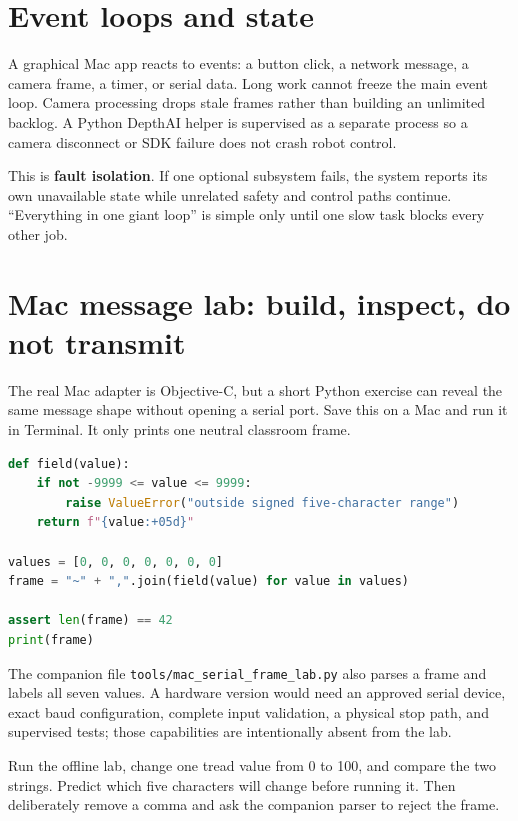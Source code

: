 \documentclass[11pt,openany]{book}
\begin{document}
\section*{Event loops and state}

A graphical Mac app reacts to events: a button click, a network message, a camera frame, a timer, or serial data. Long work cannot freeze the main event loop. Camera processing drops stale frames rather than building an unlimited backlog. A Python DepthAI helper is supervised as a separate process so a camera disconnect or SDK failure does not crash robot control.

\begin{conceptbox}
This is \textbf{fault isolation}. If one optional subsystem fails, the system reports its own unavailable state while unrelated safety and control paths continue. ``Everything in one giant loop'' is simple only until one slow task blocks every other job.
\end{conceptbox}

\section*{Mac message lab: build, inspect, do not transmit}

The real Mac adapter is Objective-C, but a short Python exercise can reveal the same message shape without opening a serial port. Save this on a Mac and run it in Terminal. It only prints one neutral classroom frame.

\begin{lstlisting}[language=Python,caption={A print-only Mac exercise; it does not connect to ROB.}]
def field(value):
    if not -9999 <= value <= 9999:
        raise ValueError("outside signed five-character range")
    return f"{value:+05d}"

values = [0, 0, 0, 0, 0, 0, 0]
frame = "~" + ",".join(field(value) for value in values)

assert len(frame) == 42
print(frame)
\end{lstlisting}

The companion file \texttt{tools/mac\_serial\_frame\_lab.py} also parses a frame and labels all seven values. A hardware version would need an approved serial device, exact baud configuration, complete input validation, a physical stop path, and supervised tests; those capabilities are intentionally absent from the lab.

\begin{buildbox}[title={CHANGE ONE THING}]
Run the offline lab, change one tread value from 0 to 100, and compare the two strings. Predict which five characters will change before running it. Then deliberately remove a comma and ask the companion parser to reject the frame.
\end{buildbox}
\end{document}
